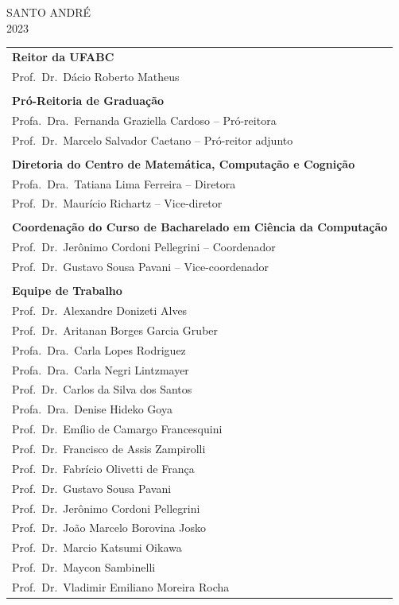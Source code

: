 \documentclass[a4paper]{article}
\begin{document}
\begin{center}
    SANTO ANDRÉ \\ 2023
\end{center}

\newpage

\begin{tabular}{l}
    \textbf{Reitor da UFABC}\\
    Prof.\ Dr.\ Dácio Roberto Matheus\\
    \\
    \textbf{Pró-Reitoria de Graduação}\\
    Profa.\ Dra.\ Fernanda Graziella Cardoso -- Pró-reitora\\
    Prof.\ Dr.\ Marcelo Salvador Caetano -- Pró-reitor adjunto\\
    \\
    \textbf{Diretoria do Centro de Matemática, Computação e Cognição}\\
    Profa.\ Dra.\ Tatiana Lima Ferreira -- Diretora\\
    Prof.\ Dr.\ Maurício Richartz -- Vice-diretor\\
    \\
    \textbf{Coordenação do Curso de Bacharelado em Ciência da Computação}\\
    Prof.\ Dr.\ Jerônimo Cordoni Pellegrini -- Coordenador\\
    Prof.\ Dr.\ Gustavo Sousa Pavani -- Vice-coordenador\\
    \\
    \textbf{Equipe de Trabalho}\\
    Prof.\ Dr.\ Alexandre Donizeti Alves\\
    Prof.\ Dr.\ Aritanan Borges Garcia Gruber\\
    Profa.\ Dra.\ Carla Lopes Rodriguez\\
    Profa.\ Dra.\ Carla Negri Lintzmayer\\
    Prof.\ Dr.\ Carlos da Silva dos Santos\\
    Profa.\ Dra.\ Denise Hideko Goya\\
    Prof.\ Dr.\ Emílio de Camargo Francesquini\\
    Prof.\ Dr.\ Francisco de Assis Zampirolli\\
    Prof.\ Dr.\ Fabrício Olivetti de França\\
    Prof.\ Dr.\ Gustavo Sousa Pavani\\
    Prof.\ Dr.\ Jerônimo Cordoni Pellegrini\\
    Prof.\ Dr.\ João Marcelo Borovina Josko\\
    Prof.\ Dr.\ Marcio Katsumi Oikawa\\
    Prof.\ Dr.\ Maycon Sambinelli\\
    Prof.\ Dr.\ Vladimir Emiliano Moreira Rocha\\
\end{tabular}
\end{document}

